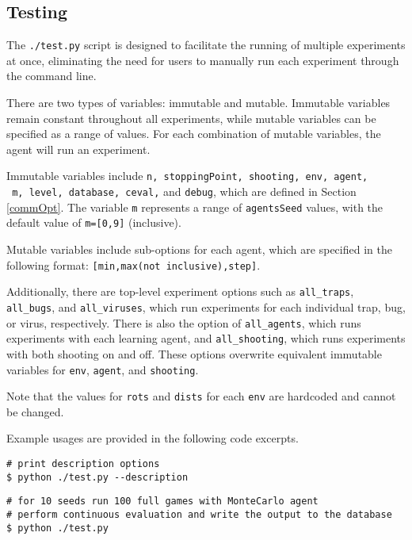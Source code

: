 \subsection{Testing}
The \texttt{./test.py} script is designed to facilitate the running of multiple experiments at once, eliminating the need for users to manually run each experiment through the command line.

There are two types of variables: immutable and mutable. Immutable variables remain constant throughout all experiments, while mutable variables can be specified as a range of values. For each combination of mutable variables, the agent will run an experiment.

Immutable variables include \texttt{n, stoppingPoint, shooting, env, agent,} \\\texttt{ m, level, database, ceval,} and \texttt{debug}, which are defined in Section \ref{commOpt}. The variable \texttt{m} represents a range of \texttt{agentsSeed} values, with the default value of \texttt{m=[0,9]} (inclusive).

Mutable variables include sub-options for each agent, which are specified in the following format: \texttt{[min,max(not inclusive),step]}.

Additionally, there are top-level experiment options such as \texttt{all\_traps}, \\ \texttt{all\_bugs}, and \texttt{all\_viruses}, which run experiments for each individual trap, bug, or virus, respectively. There is also the option of \texttt{all\_agents}, which runs experiments with each learning agent, and \texttt{all\_shooting}, which runs experiments with both shooting on and off. These options overwrite equivalent immutable variables for \texttt{env}, \texttt{agent}, and \texttt{shooting}.

Note that the values for \texttt{rots} and \texttt{dists} for each \texttt{env} are hardcoded and cannot be changed.

Example usages are provided in the following code excerpts.

\begin{center}
\hrulefill
\begin{lstlisting}
# print description options
$ python ./test.py --description
\end{lstlisting}
\hrulefill
\end{center}
    
\begin{center}
\hrulefill
\begin{lstlisting}
# for 10 seeds run 100 full games with MonteCarlo agent
# perform continuous evaluation and write the output to the database
$ python ./test.py
\end{lstlisting}
\hrulefill
\end{center}
    

